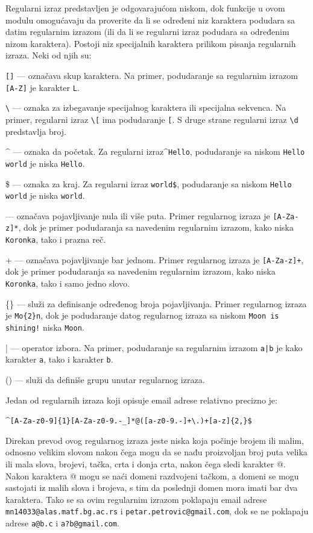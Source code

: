 \documentclass[12pt,oneside]{memoir}
\theoremstyle{plain}
\theoremstyle{definition}
\begin{document}
Regularni izraz predstavljen je odgovarajućom niskom, dok funkcije u ovom modulu omogućavaju da proverite da li se određeni niz karaktera podudara sa datim regularnim izrazom (ili da li se regularni izraz podudara sa određenim nizom karaktera).
Postoji niz specijalnih karaktera prilikom pisanja regularnih izraza. Neki od njih su:
\begin{description}
	\item \texttt{[]} --- označava skup karaktera. Na primer, podudaranje sa regularnim izrazom \texttt{[A-Z]} je karakter \texttt{L}.
	\item \texttt{\textbackslash} --- oznaka za izbegavanje specijalnog karaktera ili specijalna sekvenca. Na primer, regularni izraz \texttt{\textbackslash[} ima podudaranje \texttt{[}. S druge strane regularni izraz \texttt{\textbackslash d}  predstavlja broj.
	\item $\^$ --- oznaka da početak. Za regularni izraz\quad \texttt{$\^$Hello}, podudaranje sa niskom \texttt{Hello world} je niska \texttt{Hello}.
	\item \$ --- oznaka za kraj. Za regularni izraz \texttt{world\$}, podudaranje sa niskom \texttt{Hello world} je niska \texttt{world}.
	\item * --- označava pojavljivanje nula ili više puta. Primer regularnog izraza je \texttt{[A-Za-z]*}, dok je primer podudaranja sa navedenim regularnim izrazom, kako niska \texttt{Koronka}, tako i prazna reč.
	\item + --- označava pojavljivanje bar jednom. Primer regularnog izraza je \texttt{[A-Za-z]+}, dok je primer podudaranja sa navedenim regularnim izrazom, kako niska \texttt{Koronka}, tako i samo jedno slovo.
	\item \{\} --- služi za definisanje određenog broja pojavljivanja. Primer regularnog izraza je \texttt{Mo\{2\}n}, dok je podudaranje datog regularnog izraza sa niskom \texttt{Moon is shining!} niska \texttt{Moon}.
	\item | --- operator izbora. Na primer, podudaranje sa regularnim izrazom \texttt{a|b} je kako karakter \texttt{a}, tako i karakter \texttt{b}.
	\item () --- služi da definiše grupu unutar regularnog izraza.
\end{description}

Jedan od regularnih izraza koji opisuje email adrese relativno precizno je: 
\begin{center}
\texttt{$\^$[A-Za-z0-9]\{1\}[A-Za-z0-9.-\_]*@([a-z0-9.-]+\textbackslash .)+[a-z]\{2,\}\$}
\end{center}
Direkan prevod ovog regularnog izraza jeste niska koja počinje brojem ili malim, odnosno velikim slovom nakon čega mogu da se nađu proizvoljan broj puta velika ili mala slova, brojevi, tačka, crta i donja crta, nakon čega sledi karakter @. Nakon karaktera @ mogu se naći domeni razdvojeni tačkom, a domeni se mogu sastojati iz malih slova i brojeva, s tim da poslednji domen mora imati bar dva karaktera. Tako se sa ovim regularnim izrazom poklapaju email adrese \texttt{mn14033@alas.matf.bg.ac.rs} i \texttt{petar.petrovic@gmail.com}, dok se ne poklapaju adrese \texttt{a@b.c} i \texttt{a?b@gmail.com}.
\end{document}
